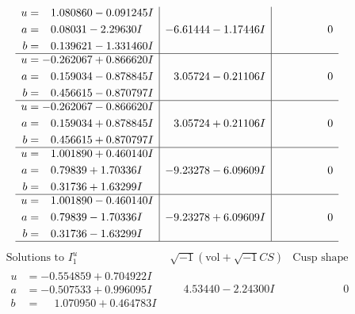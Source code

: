 \documentclass[1p]{elsarticle_modified}
\theoremstyle{definition}
\newcommand{\I}{\sqrt{-1}}
\begin{document}
$$\begin{array}{c|c|c}
\begin{aligned}
u &= \phantom{-}1.080860 - 0.091245 I \\
a &= \phantom{-}0.08031 - 2.29630 I \\
b &= \phantom{-}0.139621 - 1.331460 I\end{aligned}
 & -6.61444 - 1.17446 I & \phantom{-0.000000 } 0 \\ \hline\begin{aligned}
u &= -0.262067 + 0.866620 I \\
a &= \phantom{-}0.159034 - 0.878845 I \\
b &= \phantom{-}0.456615 - 0.870797 I\end{aligned}
 & \phantom{-}3.05724 - 0.21106 I & \phantom{-0.000000 } 0 \\ \hline\begin{aligned}
u &= -0.262067 - 0.866620 I \\
a &= \phantom{-}0.159034 + 0.878845 I \\
b &= \phantom{-}0.456615 + 0.870797 I\end{aligned}
 & \phantom{-}3.05724 + 0.21106 I & \phantom{-0.000000 } 0 \\ \hline\begin{aligned}
u &= \phantom{-}1.001890 + 0.460140 I \\
a &= \phantom{-}0.79839 + 1.70336 I \\
b &= \phantom{-}0.31736 + 1.63299 I\end{aligned}
 & -9.23278 - 6.09609 I & \phantom{-0.000000 } 0 \\ \hline\begin{aligned}
u &= \phantom{-}1.001890 - 0.460140 I \\
a &= \phantom{-}0.79839 - 1.70336 I \\
b &= \phantom{-}0.31736 - 1.63299 I\end{aligned}
 & -9.23278 + 6.09609 I & \phantom{-0.000000 } 0\\
 \hline 
 \end{array}$$\newpage$$\begin{array}{c|c|c}  
\text{Solutions to }I^u_{1}& \I (\text{vol} + \sqrt{-1}CS) & \text{Cusp shape}\\
 \hline 
\begin{aligned}
u &= -0.554859 + 0.704922 I \\
a &= -0.507533 + 0.996095 I \\
b &= \phantom{-}1.070950 + 0.464783 I\end{aligned}
 & \phantom{-}4.53440 - 2.24300 I & \phantom{-0.000000 } 0 \\ \hline\begin{aligned}

\end{aligned}
\end{array}$$
\end{document}
